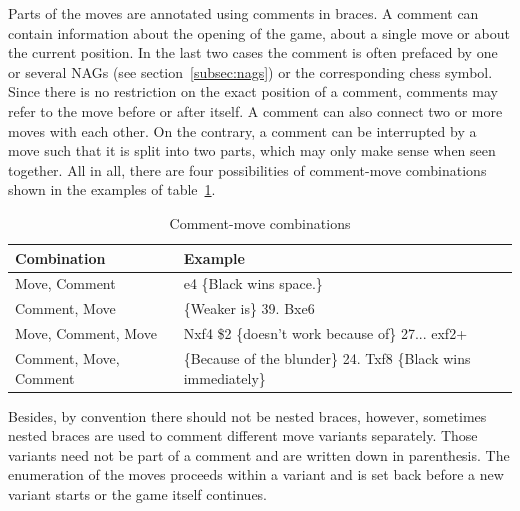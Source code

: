 \documentclass[article,type=msc,colorback,accentcolor=tud7b]{tudthesis}
\begin{document}
  	
	Parts of the moves are annotated using comments in braces. A comment can contain information about the opening of the game, about a single move or about the current position. In the last two cases the comment is often prefaced by one or several NAGs (see section~\ref{subsec:nags}) or the corresponding chess symbol. Since there is no restriction on the exact position of a comment, comments may refer to the move before or after itself. A comment can also connect two or more moves with each other. On the contrary, a comment can be interrupted by a move such that it is split into two parts, which may only make sense when seen together. All in all, there are four possibilities of comment-move combinations shown in the examples of table~\ref{tab:comment_move_combinations}.
	
	\begin{table}[H]
      \centering
      \begin{tabular}{| l | l |}
    	\hline
    	Combination & Example \\ \hline
    	Move, Comment & e4 \{Black wins space.\} \\ \hline
    	Comment, Move & \{Weaker is\} 39. Bxe6 \\ \hline
    	Move, Comment, Move & Nxf4 \$2 \{doesn't work because of\} 27... exf2+ \\ \hline
    	Comment, Move, Comment & \{Because of the blunder\} 24. Txf8 \{Black wins immediately\} \\ \hline
      \end{tabular}      
      \caption{Comment-move combinations}
      \label{tab:comment_move_combinations}
    \end{table}
    
    Besides, by convention there should not be nested braces, however, sometimes nested braces are used to comment different move variants separately.	Those variants need not be part of a comment and are written down in parenthesis. The enumeration of the moves proceeds within a variant and is set back before a new variant starts or the game itself continues. 
   
\end{document}
